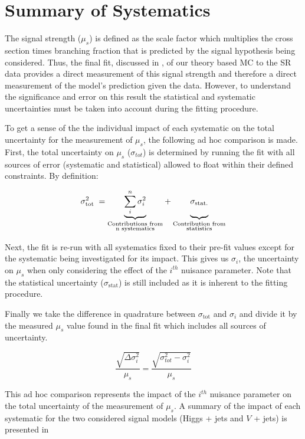 \section{Summary of Systematics} \label{sec:systematics:summary}

The signal strength ($\mu_{s}$) is defined as the scale factor which multiplies
the cross section times branching fraction that is predicted by the signal
hypothesis being considered.  Thus, the final fit, discussed in
, of our theory based MC to the SR data provides a direct
measurement of this signal strength and therefore a direct measurement of the
model's prediction given the data. However, to understand the significance and
error on this result the statistical and systematic uncertainties must be taken
into account during the fitting procedure.

To get a sense of the the individual impact of each systematic on the total
uncertainty for the measurement of $\mu_{s}$, the following ad hoc comparison
is made.  First, the total uncertainty on $\mu_{s}$ ($\sigma_{tot}$) is
determined by running the fit with all sources of error (systematic and
statistical) allowed to float within their defined constraints.  By definition:

$$ \sigma_{\text{tot}}^{2} \; = {\underbrace{\sum_{i}^{n} \sigma_{i}^{2}}_{\substack{\text{Contributions from} \\ \text{n systematics}}}} + {\underbrace{\vphantom{\sum_{i}^{n}} \sigma_{\text{stat.}}}_{\substack{\text{Contribution from} \\ \text{statistics}}}}$$

Next, the fit is re-run with all systematics fixed to their pre-fit values
except for the systematic being investigated for its impact. This gives us
$\sigma_{i}$, the uncertainty on $\mu_{s}$ when only considering the effect of
the $i^{th}$ nuisance parameter. Note that the statistical uncertainty
($\sigma_{\text{stat}}$) is still included as it is inherent to the fitting
procedure.

Finally we take the difference in quadrature between $\sigma_{\text{tot}}$ and
$\sigma_{i}$ and divide it by the measured $\mu_{s}$ value found in the final
fit which includes all sources of uncertainty. 

$$ \frac{\sqrt{\Delta \sigma_i^2}}{\mu_{s}} = \frac{\sqrt{\sigma_{tot}^2 - \sigma_i^2}}{\mu_{s}} $$

This ad hoc comparison represents the impact of the $i^{th}$ nuisance parameter
on the total uncertainty of the measurement of $\mu_{s}$. A summary of the
impact of each systematic for the two considered signal models (Higgs + jets
and $V$ + jets) is presented in 

